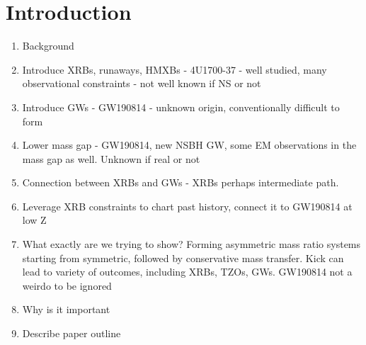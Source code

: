 \documentclass[linenumbers,trackchanges,twocolumn]{aastex701}
\begin{document}

\section{Introduction}

\begin{enumerate}
    \item Background
    \item Introduce XRBs, runaways, HMXBs - 4U1700-37 - well studied, many observational constraints - not well known if NS or not
    \item Introduce GWs  - GW190814 - unknown origin, conventionally difficult to form
    \item Lower mass gap - GW190814, new NSBH GW, some EM observations in the mass gap as well. Unknown if real or not
    \item Connection between XRBs and GWs - XRBs perhaps intermediate path.
    \item Leverage XRB constraints to chart past history, connect it to GW190814 at low Z
    \item What exactly are we trying to show? Forming asymmetric mass ratio systems starting from symmetric, followed by conservative mass transfer. Kick can lead to variety of outcomes, including XRBs, TZOs, GWs. GW190814 not a weirdo to be ignored
    \item Why is it important
    \item Describe paper outline
\end{enumerate}
\end{document}
